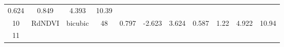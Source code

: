 \documentclass[twoside,12pt,final]{ucthesis-CA2012}
\begin{document}
\begin{ucmainmatter}
\begin{longtable}[]{@{}ccccccccccc@{}}
\begin{minipage}[t]{0.07\columnwidth}
0.624\strut
\end{minipage} & \begin{minipage}[t]{0.05\columnwidth}\centering\strut
0.849\strut
\end{minipage} & \begin{minipage}[t]{0.05\columnwidth}\centering\strut
4.393\strut
\end{minipage} & \begin{minipage}[t]{0.05\columnwidth}\centering\strut
10.39\strut
\end{minipage}\tabularnewline
\begin{minipage}[t]{0.04\columnwidth}\centering\strut
10\strut
\end{minipage} & \begin{minipage}[t]{0.11\columnwidth}\centering\strut
RdNDVI\strut
\end{minipage} & \begin{minipage}[t]{0.06\columnwidth}\centering\strut
bicubic\strut
\end{minipage} & \begin{minipage}[t]{0.08\columnwidth}\centering\strut
48\strut
\end{minipage} & \begin{minipage}[t]{0.08\columnwidth}\centering\strut
0.797\strut
\end{minipage} & \begin{minipage}[t]{0.07\columnwidth}\centering\strut
-2.623\strut
\end{minipage} & \begin{minipage}[t]{0.07\columnwidth}\centering\strut
3.624\strut
\end{minipage} & \begin{minipage}[t]{0.07\columnwidth}\centering\strut
0.587\strut
\end{minipage} & \begin{minipage}[t]{0.05\columnwidth}\centering\strut
1.22\strut
\end{minipage} & \begin{minipage}[t]{0.05\columnwidth}\centering\strut
4.922\strut
\end{minipage} & \begin{minipage}[t]{0.05\columnwidth}\centering\strut
10.94\strut
\end{minipage}\tabularnewline
\begin{minipage}[t]{0.04\columnwidth}\centering\strut
11\strut
\end{minipage} & \begin{minipage}[t]{0.11\columnwidth}\centering\strut

\end{minipage}
\end{longtable}
\end{ucmainmatter}
\end{document}
